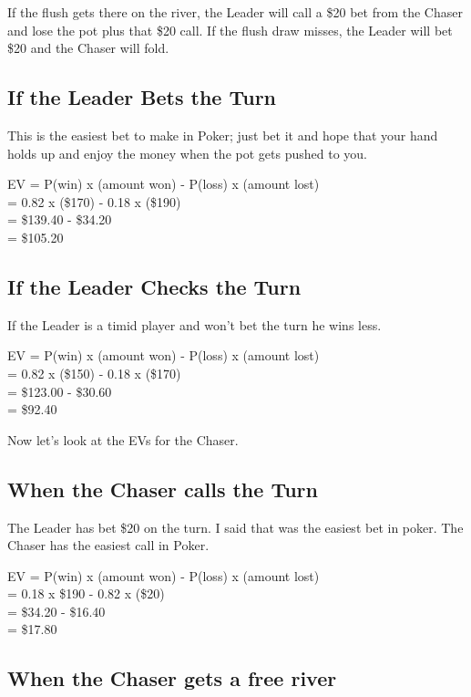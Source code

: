 If the flush gets there on the river, the Leader will call a \$20 bet
from the Chaser and lose the pot plus that \$20 call. If the flush draw
misses, the Leader will bet \$20 and the Chaser will fold.

\subsection{If the Leader Bets the Turn}

This is the easiest bet to make in Poker; just bet it and hope that
your hand holds up and enjoy the money when the pot gets pushed to
you.

EV = P(win) x (amount won) - P(loss) x (amount lost) \\
   = 0.82   x (\$170)      - 0.18    x (\$190) \\
   = \$139.40 - \$34.20 \\
   = \$105.20

\subsection{If the Leader Checks the Turn}

If the Leader is a timid player and won't bet the turn
he wins less.

EV = P(win) x (amount won) - P(loss) x (amount lost) \\
   = 0.82   x (\$150)      - 0.18    x (\$170) \\
   = \$123.00 - \$30.60 \\
   = \$92.40

Now let's look at the EVs for the Chaser.

\subsection{When the Chaser calls the Turn}

The Leader has bet \$20 on the turn. I said that was the easiest
bet in poker. The Chaser has the easiest call in Poker.

EV = P(win) x (amount won) - P(loss) x (amount lost) \\
   = 0.18 x \$190 - 0.82 x (\$20) \\
   = \$34.20 - \$16.40 \\
   = \$17.80

\subsection{When the Chaser gets a free river}

